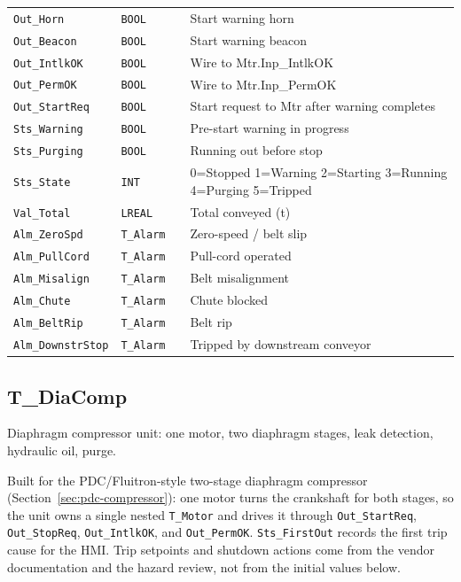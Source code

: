 \begin{small}
\begin{longtable}{@{}P{3.70cm}P{2.20cm}P{1.70cm}P{8.91cm}@{}}
\texttt{Out\_Horn} & \texttt{BOOL} &  & Start warning horn \\
\texttt{Out\_Beacon} & \texttt{BOOL} &  & Start warning beacon \\
\texttt{Out\_IntlkOK} & \texttt{BOOL} &  & Wire to Mtr.Inp\_IntlkOK \\
\texttt{Out\_PermOK} & \texttt{BOOL} &  & Wire to Mtr.Inp\_PermOK \\
\texttt{Out\_StartReq} & \texttt{BOOL} &  & Start request to Mtr after warning completes \\
\texttt{Sts\_Warning} & \texttt{BOOL} &  & Pre-start warning in progress \\
\texttt{Sts\_Purging} & \texttt{BOOL} &  & Running out before stop \\
\texttt{Sts\_State} & \texttt{INT} &  & 0=Stopped 1=Warning 2=Starting 3=Running 4=Purging 5=Tripped \\
\texttt{Val\_Total} & \texttt{LREAL} &  & Total conveyed (t) \\
\texttt{Alm\_ZeroSpd} & \texttt{T\_Alarm} &  & Zero-speed /\allowbreak{} belt slip \\
\texttt{Alm\_PullCord} & \texttt{T\_Alarm} &  & Pull-cord operated \\
\texttt{Alm\_Misalign} & \texttt{T\_Alarm} &  & Belt misalignment \\
\texttt{Alm\_Chute} & \texttt{T\_Alarm} &  & Chute blocked \\
\texttt{Alm\_BeltRip} & \texttt{T\_Alarm} &  & Belt rip \\
\texttt{Alm\_DownstrStop} & \texttt{T\_Alarm} &  & Tripped by downstream conveyor \\
\bottomrule
\end{longtable}
\end{small}

\subsection{T\_DiaComp}\label{sec:pclib-t-diacomp}

Diaphragm compressor unit: one motor, two diaphragm stages, leak detection, hydraulic oil, purge.

\par{}\par

Built for the PDC/Fluitron-style two-stage diaphragm compressor (Section~\ref{sec:pdc-compressor}): one motor turns the crankshaft for both stages, so the unit owns a single nested \texttt{T\_Motor} and drives it through \texttt{Out\_StartReq}, \texttt{Out\_StopReq}, \texttt{Out\_IntlkOK}, and \texttt{Out\_PermOK}. \texttt{Sts\_FirstOut} records the first trip cause for the HMI. Trip setpoints and shutdown actions come from the vendor documentation and the hazard review, not from the initial values below.

